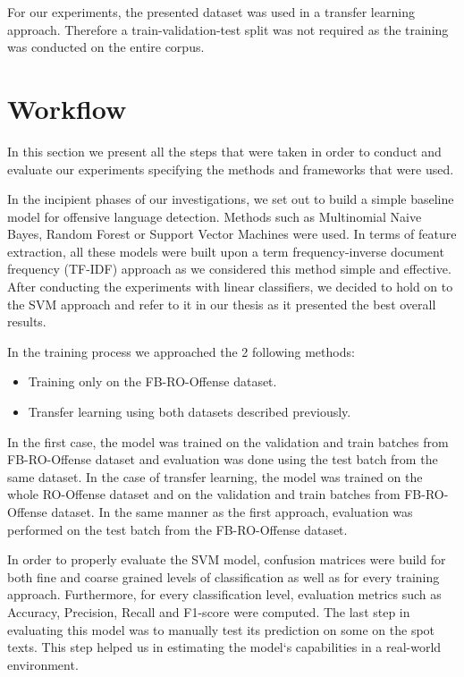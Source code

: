 \documentclass[12pt,a4paper]{report}
\begin{document}
For our experiments, the presented dataset was used in a transfer learning approach. Therefore a train-validation-test split was not required as the training was conducted on the entire corpus.

\section{Workflow}
\label{section:workflow}
In this section we present all the steps that were taken in order to conduct and evaluate our experiments specifying the methods and frameworks that were used.

In the incipient phases of our investigations, we set out to build a simple baseline model for offensive language detection. Methods such as Multinomial Naive Bayes, Random Forest or Support Vector Machines were used. In terms of feature extraction, all these models were built upon a term frequency-inverse document frequency (TF-IDF) approach as we considered this method simple and effective. After conducting the experiments with linear classifiers, we decided to hold on to the SVM approach and refer to it in our thesis as it presented the best overall results.

In the training process we approached the 2 following methods:
\begin{itemize}
    \item Training only on the FB-RO-Offense dataset.
    \item Transfer learning using both datasets described previously.
\end{itemize}

In the first case, the model was trained on the validation and train batches from FB-RO-Offense dataset and evaluation was done using the test batch from the same dataset. 
In the case of transfer learning, the model was trained on the whole RO-Offense dataset and on the validation and train batches from FB-RO-Offense dataset. In the same manner as the first approach, evaluation was performed on the test batch from the FB-RO-Offense dataset.

In order to properly evaluate the SVM model, confusion matrices were build for both fine and coarse grained levels of classification as well as for every training approach. Furthermore, for every classification level, evaluation metrics such as Accuracy, Precision, Recall and F1-score were computed. The last step in evaluating this model was to manually test its prediction on some on the spot texts. This step helped us in estimating the model`s capabilities in a real-world environment.
\end{document}
